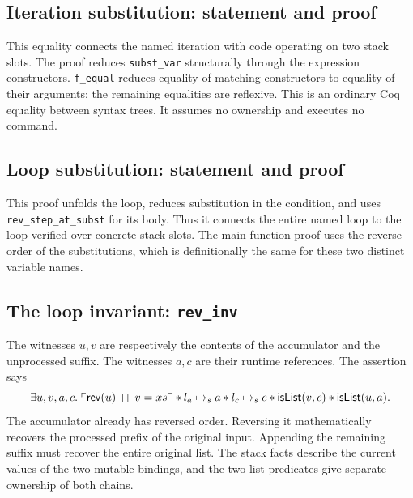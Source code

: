 \documentclass[11pt]{article}
\newcommand{\ptss}{\mathrel{\mapsto_{s}}}
\newcommand{\sep}{\mathbin{*}}
\newcommand{\pure}[1]{\ulcorner #1 \urcorner}
\begin{document}
\subsection{Iteration substitution: statement and proof}

\begin{minipage}{\linewidth}

\end{minipage}

This equality connects the named iteration with code operating on two stack
slots. The proof reduces \texttt{subst\_var} structurally through the
expression constructors. \texttt{f\_equal} reduces equality of matching
constructors to equality of their arguments; the remaining equalities are
reflexive. This is an ordinary Coq equality between syntax trees. It assumes
no ownership and executes no command.

\subsection{Loop substitution: statement and proof}

\begin{minipage}{\linewidth}

\end{minipage}

This proof unfolds the loop, reduces substitution in the condition, and uses
\texttt{rev\_step\_at\_subst} for its body. Thus it connects the entire named
loop to the loop verified over concrete stack slots. The main function proof
uses the reverse order of the substitutions, which is definitionally the same
for these two distinct variable names.

\subsection{The loop invariant: \texttt{rev\_inv}}

\begin{minipage}{\linewidth}

\end{minipage}

The witnesses \(u,v\) are respectively the contents of the accumulator and
the unprocessed suffix. The witnesses \(a,c\) are their runtime references.
The assertion says
\[
\exists u,v,a,c.\;
 \pure{\mathsf{rev}(u)\mathbin{+\mkern-6mu+}v=xs}
 \sep l_a\ptss a \sep l_c\ptss c
 \sep\mathsf{isList}(v,c)\sep\mathsf{isList}(u,a).
\]
The accumulator already has reversed order. Reversing it mathematically
recovers the processed prefix of the original input. Appending the remaining
suffix must recover the entire original list. The stack facts describe the
current values of the two mutable bindings, and the two list predicates give
separate ownership of both chains.
\end{document}
